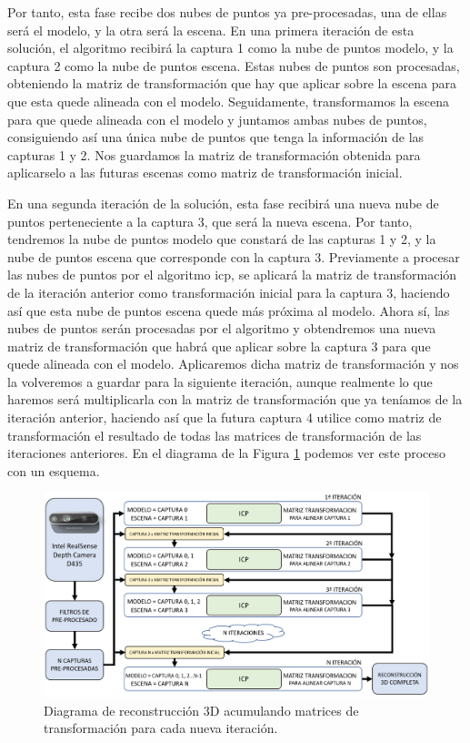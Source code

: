 Por tanto, esta fase recibe dos nubes de puntos ya pre-procesadas, una de ellas será el modelo, y la otra será la escena.
En una primera iteración de esta solución, el algoritmo recibirá la captura 1 como la nube de puntos modelo, y la captura 2 como la nube de puntos escena.
Estas nubes de puntos son procesadas, obteniendo la matriz de transformación que hay que aplicar sobre la escena para que esta quede alineada con el modelo.
Seguidamente, transformamos la escena para que quede alineada con el modelo y juntamos ambas nubes de puntos, consiguiendo así una única nube de puntos que tenga la información de las capturas 1 y 2.
Nos guardamos la matriz de transformación obtenida para aplicarselo a las futuras escenas como matriz de transformación inicial.

En una segunda iteración de la solución, esta fase recibirá una nueva nube de puntos perteneciente a la captura 3, que será la nueva escena.
Por tanto, tendremos la nube de puntos modelo que constará de las capturas 1 y 2, y la nube de puntos escena que corresponde con la captura 3.
Previamente a procesar las nubes de puntos por el algoritmo \gls{icp}, se aplicará la matriz de transformación de la iteración anterior como transformación inicial para la captura 3, haciendo así que esta nube de puntos escena quede más próxima al modelo.
Ahora sí, las nubes de puntos serán procesadas por el algoritmo y obtendremos una nueva matriz de transformación que habrá que aplicar sobre la captura 3 para que quede alineada con el modelo.
Aplicaremos dicha matriz de transformación y nos la volveremos a guardar para la siguiente iteración, aunque realmente lo que haremos será multiplicarla con la matriz de transformación que ya teníamos de la iteración anterior, haciendo así que la futura captura 4 utilice como matriz de transformación el resultado de todas las matrices de transformación de las iteraciones anteriores.
En el diagrama de la Figura \ref{fig:diagrama-acumulacion-matriz-transformacion} podemos ver este proceso con un esquema.

\begin{figure}[h]
    \centering
    \includegraphics[width=\textwidth]{archivos/diagrama-acumulacion-matriz-transformacion.png}
    \caption{Diagrama de reconstrucción 3D acumulando matrices de transformación para cada nueva iteración.}
    \label{fig:diagrama-acumulacion-matriz-transformacion}
\end{figure}

